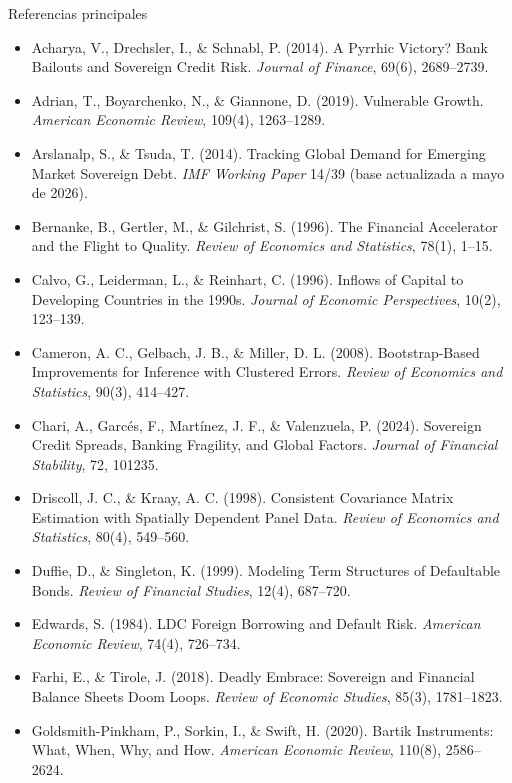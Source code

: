 \documentclass[aspectratio=169]{beamer}
\begin{document}
\begin{frame}[allowframebreaks]{Referencias principales}
\scriptsize
\begin{itemize}
\item Acharya, V., Drechsler, I., \& Schnabl, P. (2014). A Pyrrhic Victory? Bank Bailouts and Sovereign Credit Risk. \textit{Journal of Finance}, 69(6), 2689--2739.
\item Adrian, T., Boyarchenko, N., \& Giannone, D. (2019). Vulnerable Growth. \textit{American Economic Review}, 109(4), 1263--1289.
\item Arslanalp, S., \& Tsuda, T. (2014). Tracking Global Demand for Emerging Market Sovereign Debt. \textit{IMF Working Paper} 14/39 (base actualizada a mayo de 2026).
\item Bernanke, B., Gertler, M., \& Gilchrist, S. (1996). The Financial Accelerator and the Flight to Quality. \textit{Review of Economics and Statistics}, 78(1), 1--15.
\item Calvo, G., Leiderman, L., \& Reinhart, C. (1996). Inflows of Capital to Developing Countries in the 1990s. \textit{Journal of Economic Perspectives}, 10(2), 123--139.
\item Cameron, A. C., Gelbach, J. B., \& Miller, D. L. (2008). Bootstrap-Based Improvements for Inference with Clustered Errors. \textit{Review of Economics and Statistics}, 90(3), 414--427.
\item Chari, A., Garcés, F., Martínez, J. F., \& Valenzuela, P. (2024). Sovereign Credit Spreads, Banking Fragility, and Global Factors. \textit{Journal of Financial Stability}, 72, 101235.
\item Driscoll, J. C., \& Kraay, A. C. (1998). Consistent Covariance Matrix Estimation with Spatially Dependent Panel Data. \textit{Review of Economics and Statistics}, 80(4), 549--560.
\item Duffie, D., \& Singleton, K. (1999). Modeling Term Structures of Defaultable Bonds. \textit{Review of Financial Studies}, 12(4), 687--720.
\item Edwards, S. (1984). LDC Foreign Borrowing and Default Risk. \textit{American Economic Review}, 74(4), 726--734.
\item Farhi, E., \& Tirole, J. (2018). Deadly Embrace: Sovereign and Financial Balance Sheets Doom Loops. \textit{Review of Economic Studies}, 85(3), 1781--1823.
\item Goldsmith-Pinkham, P., Sorkin, I., \& Swift, H. (2020). Bartik Instruments: What, When, Why, and How. \textit{American Economic Review}, 110(8), 2586--2624.

\end{itemize}
\end{frame}
\end{document}
